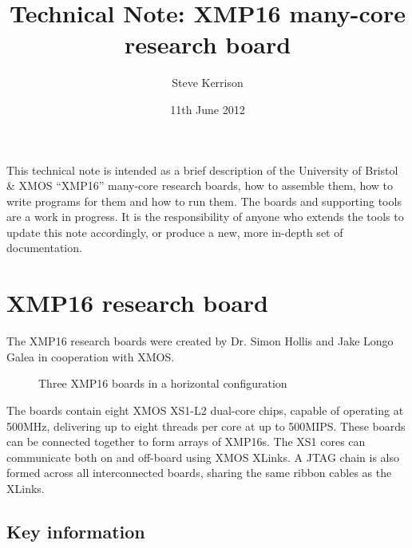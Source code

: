 \documentclass[12pt,a4paper,final,twoside]{article}
\begin{document}
\title{Technical Note: XMP16 many-core research board}
\author{Steve Kerrison}
\date{11th June 2012}
\maketitle

This technical note is intended as a brief description of the University of Bristol \& XMOS ``XMP16'' many-core research boards, how to assemble them, how to write programs for them and how to run them. The boards and supporting tools are a work in progress. It is the responsibility of anyone who extends the tools to update this note accordingly, or produce a new, more in-depth set of documentation.

\section{XMP16 research board}

The XMP16 research boards were created by Dr. Simon Hollis and Jake Longo Galea in cooperation with XMOS.

\begin{figure}[htbp]
\centering
\setlength\fboxsep{0pt}
\setlength\fboxrule{1pt}
\caption{Three XMP16 boards in a horizontal configuration}
\end{figure}

The boards contain eight XMOS XS1-L2 dual-core chips, capable of operating at 500MHz, delivering up to eight threads per core at up to 500MIPS. These boards can be connected together to form arrays of XMP16s. The XS1 cores can communicate both on and off-board using XMOS XLinks. A JTAG chain is also formed across all interconnected boards, sharing the same ribbon cables as the XLinks.

\subsection{Key information}
\end{document}
